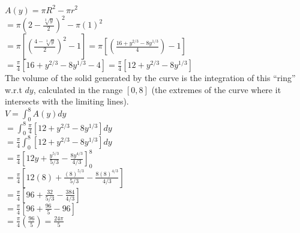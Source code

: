 \documentclass{article}
\begin{document}
{   $ A(y) = \pi{R}^2-\pi{r}^2 $ \\

   $ = \pi(2-\frac{\sqrt[3]{y}}{2})^2 - \pi{(1)}^2 $\\

   $ = \pi \left[ (\frac{4-\sqrt[3]{y}}{2})^2 - 1 \right]
   = \pi \left[ (\frac{16+{y}^{2/3}-8{y}^{1/3}}{4}) - 1 \right] $\\
   
   $ = \frac{\pi}{4} \left[ 16 + {y}^{2/3} - 8{y}^{1/3} - 4 \right]
   = \frac{\pi}{4} \left[ 12 + {y}^{2/3} - 8{y}^{1/3} \right] $\\

   The volume of the solid generated by the curve is 
   the integration of this ``ring'' w.r.t $dy$,
   calculated in the range $[0,8]$
   (the extremes of the curve where it intersects with the limiting lines).\\
   
   $ V = \int_{0}^{8}{A(y)} dy $\\

   $ = \int_{0}^{8}{\frac{\pi}{4} \left[ 12 + {y}^{2/3} - 8{y}^{1/3} \right]} dy $\\

   $ = \frac{\pi}{4} \int_{0}^{8}{\left[ 12 + {y}^{2/3} - 8{y}^{1/3} \right]} dy $\\
   
   $ = \frac{\pi}{4} \left[ 12y + \frac{{y}^{5/3}}{5/3} - \frac{8{y}^{4/3}}{4/3} \right]_{0}^{8} $\\
   
   $ = \frac{\pi}{4} \left[ 12(8) + \frac{{(8)}^{5/3}}{5/3} - \frac{8{(8)}^{4/3}}{4/3} \right] $\\

   $ = \frac{\pi}{4} \left[ 96 + \frac{32}{5/3} - \frac{384}{4/3} \right] $\\

   $ = \frac{\pi}{4} \left[ 96 + \frac{96}{5} - 96 \right] $\\
   
   $ = \frac{\pi}{4} (\frac{96}{5})
   = \boxed{\frac{24\pi}{5}} $\\
}
\end{document}
